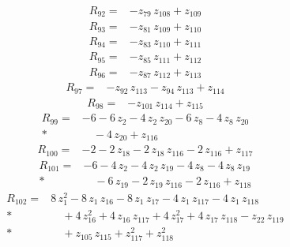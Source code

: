 \documentclass[10pt]{article}
\begin{document}
\begin{align*}
R_{92}={}& - z_{79}\,z_{108} + z_{109}
\end{align*}
\begin{align*}
R_{93}={}& - z_{81}\,z_{109} + z_{110}
\end{align*}
\begin{align*}
R_{94}={}& - z_{83}\,z_{110} + z_{111}
\end{align*}
\begin{align*}
R_{95}={}& - z_{85}\,z_{111} + z_{112}
\end{align*}
\begin{align*}
R_{96}={}& - z_{87}\,z_{112} + z_{113}
\end{align*}
\begin{align*}
R_{97}={}& - z_{92}\,z_{113} - z_{94}\,z_{113} + z_{114}
\end{align*}
\begin{align*}
R_{98}={}& - z_{101}\,z_{114} + z_{115}
\end{align*}
\begin{align*}
R_{99}={}& - 6 - 6\,z_{2} - 4\,z_{2}\,z_{20} - 6\,z_{8} - 4\,z_{8}\,z_{20} \\*
&\quad - 4\,z_{20} + z_{116}
\end{align*}
\begin{align*}
R_{100}={}& - 2 - 2\,z_{18} - 2\,z_{18}\,z_{116} - 2\,z_{116} + z_{117}
\end{align*}
\begin{align*}
R_{101}={}& - 6 - 4\,z_{2} - 4\,z_{2}\,z_{19} - 4\,z_{8} - 4\,z_{8}\,z_{19} \\*
&\quad - 6\,z_{19} - 2\,z_{19}\,z_{116} - 2\,z_{116} + z_{118}
\end{align*}
\begin{align*}
R_{102}={}& 8\,z_{1}^{2} - 8\,z_{1}\,z_{16} - 8\,z_{1}\,z_{17} - 4\,z_{1}\,z_{117} - 4\,z_{1}\,z_{118} \\*
&\quad + 4\,z_{16}^{2} + 4\,z_{16}\,z_{117} + 4\,z_{17}^{2} + 4\,z_{17}\,z_{118} - z_{22}\,z_{119} \\*
&\quad + z_{105}\,z_{115} + z_{117}^{2} + z_{118}^{2}
\end{align*}
\end{document}
